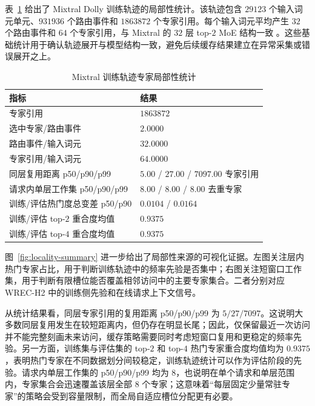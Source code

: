 表~\ref{tab:locality-statistics} 给出了 Mixtral Dolly 训练轨迹的局部性统计。该轨迹包含 $29123$ 个输入词元单元、$931936$ 个路由事件和 $1863872$ 个专家引用。每个输入词元平均产生 $32$ 个路由事件和 $64$ 个专家引用，与 Mixtral 的 $32$ 层 top-$2$ MoE 结构一致 \cite{jiang2024mixtral,mixtral}。这些基础统计用于确认轨迹展开与模型结构一致，避免后续缓存结果建立在异常采集或错误展开之上。

\begin{table}[!htbp]
    \centering
    \caption{\label{tab:locality-statistics}Mixtral 训练轨迹专家局部性统计}
    \begin{tabularx}{\linewidth}{lX}
        \hline
        指标 & 结果 \\ \hline
        专家引用 & $1863872$ \\ \hline
        选中专家/路由事件 & $2.0000$ \\ \hline
        路由事件/输入词元 & $32.0000$ \\ \hline
        专家引用/输入词元 & $64.0000$ \\ \hline
        同层复用距离 p50/p90/p99 & $5.00$ / $27.00$ / $7097.00$ 专家引用 \\ \hline
        请求内单层工作集 p50/p90/p99 & $8.00$ / $8.00$ / $8.00$ 去重专家 \\ \hline
        训练/评估热门度总变差 p50/p90 & $0.0104$ / $0.0164$ \\ \hline
        训练/评估 top-$2$ 重合度均值 & $0.9375$ \\ \hline
        训练/评估 top-$4$ 重合度均值 & $0.9375$ \\ \hline
    \end{tabularx}
\end{table}
\FloatBarrier

图~\ref{fig:locality-summary} 进一步给出了局部性来源的可视化证据。左图关注层内热门专家占比，用于判断训练轨迹中的频率先验是否集中；右图关注短窗口工作集，用于判断有限槽位能否覆盖相邻访问中的主要专家集合。二者分别对应 WREC-H2 中的训练侧先验和在线请求上下文信号。

从统计结果看，同层专家引用的复用距离 p50/p90/p99 为 $5/27/7097$。这说明大多数同层复用发生在较短距离内，但仍存在明显长尾；因此，仅保留最近一次访问并不能完整刻画未来访问，缓存策略需要同时考虑短窗口复用和更稳定的频率先验。另一方面，训练集与评估集的 top-$2$ 和 top-$4$ 热门专家重合度均值均为 $0.9375$，表明热门专家在不同数据划分间较稳定，训练轨迹统计可以作为评估阶段的先验。请求内单层工作集的 p50/p90/p99 均为 $8$，也说明在单个请求和单层范围内，专家集合会迅速覆盖该层全部 $8$ 个专家；这意味着“每层固定少量常驻专家”的策略会受到容量限制，而全局自适应槽位分配更有必要。

